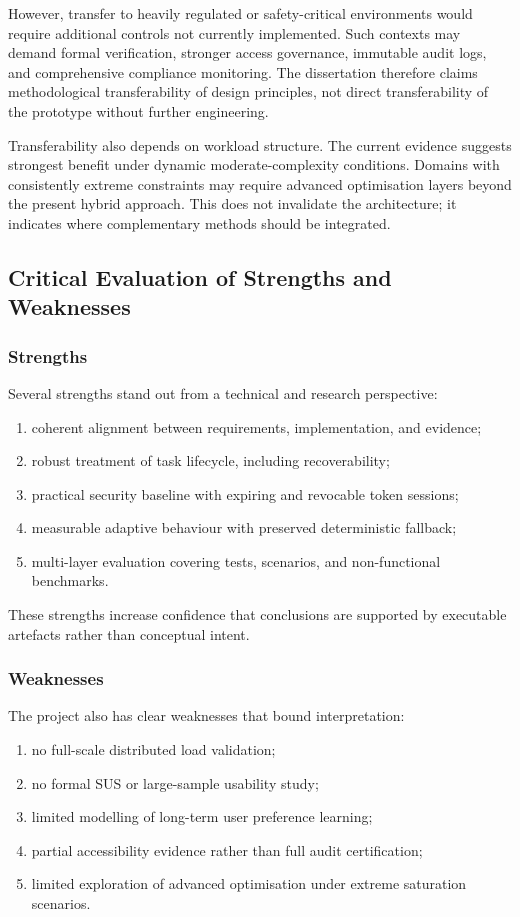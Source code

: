 \documentclass[12pt]{article}
\begin{document}
However, transfer to heavily regulated or safety-critical environments would require additional controls not currently implemented. Such contexts may demand formal verification, stronger access governance, immutable audit logs, and comprehensive compliance monitoring. The dissertation therefore claims methodological transferability of design principles, not direct transferability of the prototype without further engineering.

Transferability also depends on workload structure. The current evidence suggests strongest benefit under dynamic moderate-complexity conditions. Domains with consistently extreme constraints may require advanced optimisation layers beyond the present hybrid approach. This does not invalidate the architecture; it indicates where complementary methods should be integrated.

\subsection{Critical Evaluation of Strengths and Weaknesses}
\subsubsection{Strengths}
Several strengths stand out from a technical and research perspective:
\begin{enumerate}
    \item coherent alignment between requirements, implementation, and evidence;
    \item robust treatment of task lifecycle, including recoverability;
    \item practical security baseline with expiring and revocable token sessions;
    \item measurable adaptive behaviour with preserved deterministic fallback;
    \item multi-layer evaluation covering tests, scenarios, and non-functional benchmarks.
\end{enumerate}

These strengths increase confidence that conclusions are supported by executable artefacts rather than conceptual intent.

\subsubsection{Weaknesses}
The project also has clear weaknesses that bound interpretation:
\begin{enumerate}
    \item no full-scale distributed load validation;
    \item no formal SUS or large-sample usability study;
    \item limited modelling of long-term user preference learning;
    \item partial accessibility evidence rather than full audit certification;
    \item limited exploration of advanced optimisation under extreme saturation scenarios.
\end{enumerate}
\end{document}
